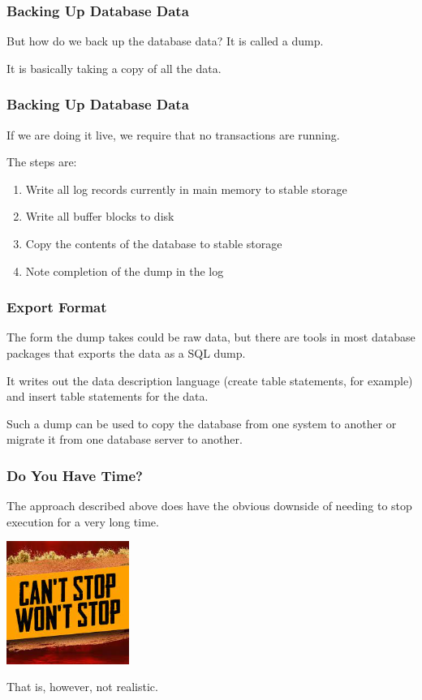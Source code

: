 \begin{frame}
\frametitle{Backing Up Database Data}


But how do we back up the database data? It is called a \alert{dump}. 

It is basically taking a copy of all the data.

\end{frame}


\begin{frame}
\frametitle{Backing Up Database Data}

If we are doing it live, we require that no transactions are running. 


The steps are:

\begin{enumerate}
	\item Write all log records currently in main memory to stable storage
	\item Write all buffer blocks to disk
	\item Copy the contents of the database to stable storage
	\item Note completion of the dump in the log
\end{enumerate}

\end{frame}

\begin{frame}
\frametitle{Export Format}

The form the dump takes could be raw data, but there are tools in most database packages that exports the data as a SQL dump. 

It writes out the data description language (create table statements, for example) and insert table statements for the data. 

Such a dump can be used to copy the database from one system to another or migrate it from one database server to another.

\end{frame}

\begin{frame}
\frametitle{Do You Have Time?}
The approach described above does have the obvious downside of needing to stop execution for a very long time. 

\begin{center}
	\includegraphics[width=0.3\textwidth]{images/cantwont.jpg}
\end{center}

That is, however, not realistic. 


\end{frame}

